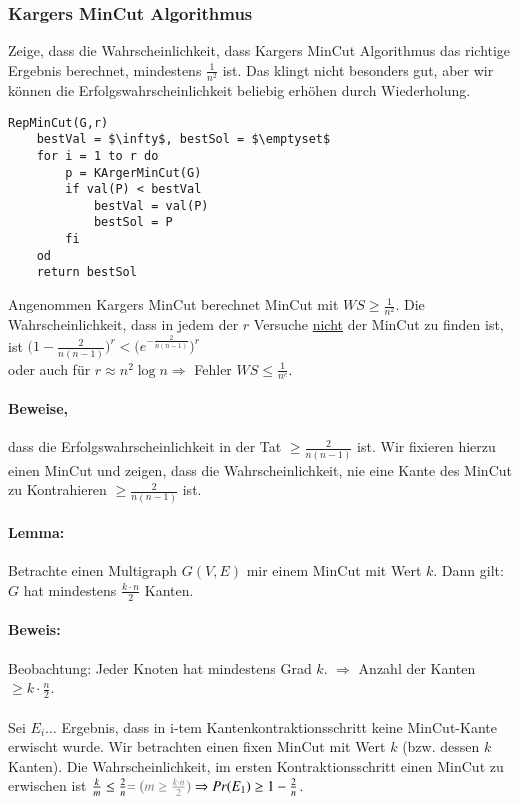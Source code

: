 \subsubsection{Kargers MinCut Algorithmus}
Zeige, dass die Wahrscheinlichkeit, dass Kargers MinCut Algorithmus das richtige Ergebnis berechnet, mindestens $\frac{1}{n^2}$ ist. Das klingt nicht besonders gut, aber wir können die Erfolgswahrscheinlichkeit beliebig erhöhen durch Wiederholung.

\begin{lstlisting}[mathescape]
RepMinCut(G,r)
	bestVal = $\infty$, bestSol = $\emptyset$
	for i = 1 to r do
		p = KArgerMinCut(G)
		if val(P) < bestVal
			bestVal = val(P)
			bestSol = P
		fi
	od
	return bestSol
\end{lstlisting}

Angenommen Kargers MinCut berechnet MinCut mit $WS \geq \frac{1}{n^2}$. Die Wahrscheinlichkeit, dass in jedem der $r$ Versuche \underline{nicht} der MinCut zu finden ist, ist $\big(1-\frac{2}{n(n-1)}\big)^r < \big(e^{-\frac{2}{n(n-1)}}\big)^r$ \\
oder auch für $r \approx n^2 \log n \Rightarrow $ Fehler $WS \leq \frac{1}{n^c}$.
\paragraph*{Beweise,} dass die Erfolgswahrscheinlichkeit in der Tat $\geq \frac{2}{n(n-1)}$ ist. Wir fixieren hierzu einen MinCut und zeigen, dass die Wahrscheinlichkeit, nie eine Kante des MinCut zu Kontrahieren $\geq \frac{2}{n(n-1)}$ ist. %

\paragraph*{Lemma:} Betrachte einen Multigraph $G(V,E)$ mir einem MinCut mit Wert $k$. Dann gilt: $G$ hat mindestens $\frac{k \cdot n}{2}$ Kanten.
\paragraph*{Beweis:} Beobachtung: Jeder Knoten hat mindestens Grad $k$. $\Rightarrow$ Anzahl der Kanten $\geq k \cdot \frac{n}{2}$.

\paragraph*{} Sei $E_i \dots$ Ergebnis, dass in i-tem Kantenkontraktionsschritt keine MinCut-Kante erwischt wurde. Wir betrachten einen fixen MinCut mit Wert $k$ (bzw. dessen $k$ Kanten). Die Wahrscheinlichkeit, im ersten Kontraktionsschritt einen MinCut zu erwischen ist $\frac{k}{m} \leq \frac{2}{n} \textcolor{gray}{= \big( m \geq \frac{k \cdot n}{2} \big)} \Rightarrow Pr(E_1) \geq 1-\frac{2}{n}$.

